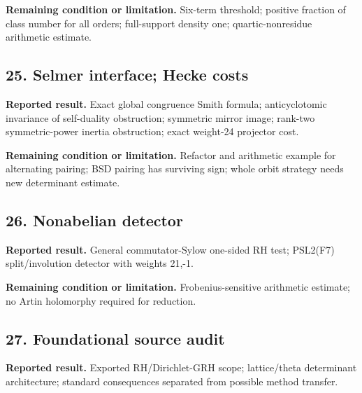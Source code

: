 \textbf{Remaining condition or limitation.} Six-term threshold; positive fraction of class number for all orders; full-support density one; quartic-nonresidue arithmetic estimate.

\subsection*{25. Selmer interface; Hecke costs}

\href{https://github.com/VladimirReshetnikov/ProveIt/blob/274841c1cb137aafbb60ab5f519c51fd42eee98e/docs/incoming/grh_structural_transfers_2026-11-25.zip}{}

\textbf{Reported result.} Exact global congruence Smith formula; anticyclotomic invariance of self-duality obstruction; symmetric mirror image; rank-two symmetric-power inertia obstruction; exact weight-24 projector cost.

\textbf{Remaining condition or limitation.} Refactor and arithmetic example for alternating pairing; BSD pairing has surviving sign; whole orbit strategy needs new determinant estimate.

\subsection*{26. Nonabelian detector}

\href{https://github.com/VladimirReshetnikov/ProveIt/blob/274841c1cb137aafbb60ab5f519c51fd42eee98e/docs/incoming/grh_sylow_transfer_2026-11-25.zip}{}

\textbf{Reported result.} General commutator-Sylow one-sided RH test; PSL2(F7) split/involution detector with weights 21,-1.

\textbf{Remaining condition or limitation.} Frobenius-sensitive arithmetic estimate; no Artin holomorphy required for reduction.

\subsection*{27. Foundational source audit}

\href{https://github.com/VladimirReshetnikov/ProveIt/blob/274841c1cb137aafbb60ab5f519c51fd42eee98e/docs/incoming/grh_transfer_analysis.zip}{}

\textbf{Reported result.} Exported RH/Dirichlet-GRH scope; lattice/theta determinant architecture; standard consequences separated from possible method transfer.

